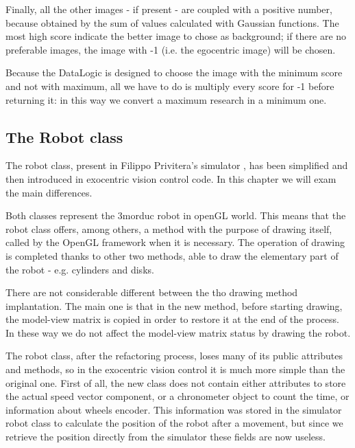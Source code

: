 %
Finally, all the other images - if present - are coupled with a positive number, because obtained by the sum of
values calculated with Gaussian functions. The most high score indicate the better image to chose as background;
if there are no preferable images, the image with -1 (i.e. the egocentric image) will be chosen.
%

%
Because the DataLogic is designed to choose the image with the minimum score and not with maximum, all we have to
do is multiply every score for -1 before returning it: in this way we convert a maximum research in a minimum one.
%

\subsection{The Robot class}
The robot class, present in Filippo Privitera's simulator 
\cite{privitera}, has been simplified and then introduced in
exocentric vision control code. In this chapter we will 
exam the main differences.
%

%
Both classes represent the 3morduc robot in openGL world. 
This means that the robot class offers, among others, a
method with the purpose of drawing itself, called by the 
OpenGL framework when it is necessary. The operation of 
drawing is completed thanks to other two methods, able 
to draw the elementary part of the robot - e.g. cylinders and disks.
%

%
There are not considerable different between the tho 
drawing method implantation. The main one is that in the 
new method, before starting drawing, the model-view matrix 
is copied in order to restore it at the end of the process. 
In these way we do not affect the model-view matrix status 
by drawing the robot.
%

%
The robot class, after the refactoring process, loses many 
of its public attributes and methods, so in the
exocentric vision control it is much more simple than the 
original one. First of all, the new class does not contain either
attributes to store the actual speed vector component, or 
a chronometer object to count the time, or information about wheels
encoder. This information was stored in the simulator robot 
class to calculate the position of the robot after a movement,
but since we retrieve the position directly from the simulator 
these fields are now useless. 
%

